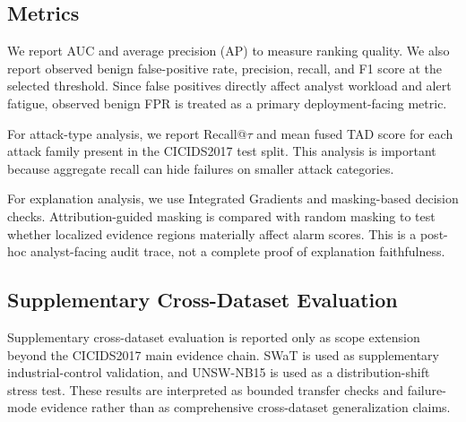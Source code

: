 \subsection{Metrics}

We report AUC and average precision (AP) to measure ranking quality. We also report observed benign false-positive rate, precision, recall, and F1 score at the selected threshold. Since false positives directly affect analyst workload and alert fatigue, observed benign FPR is treated as a primary deployment-facing metric.

For attack-type analysis, we report Recall@\(\tau\) and mean fused TAD score for each attack family present in the CICIDS2017 test split. This analysis is important because aggregate recall can hide failures on smaller attack categories.

For explanation analysis, we use Integrated Gradients and masking-based decision checks. Attribution-guided masking is compared with random masking to test whether localized evidence regions materially affect alarm scores. This is a post-hoc analyst-facing audit trace, not a complete proof of explanation faithfulness.

\subsection{Supplementary Cross-Dataset Evaluation}

Supplementary cross-dataset evaluation is reported only as scope extension beyond the CICIDS2017 main evidence chain. SWaT is used as supplementary industrial-control validation, and UNSW-NB15 is used as a distribution-shift stress test. These results are interpreted as bounded transfer checks and failure-mode evidence rather than as comprehensive cross-dataset generalization claims.
